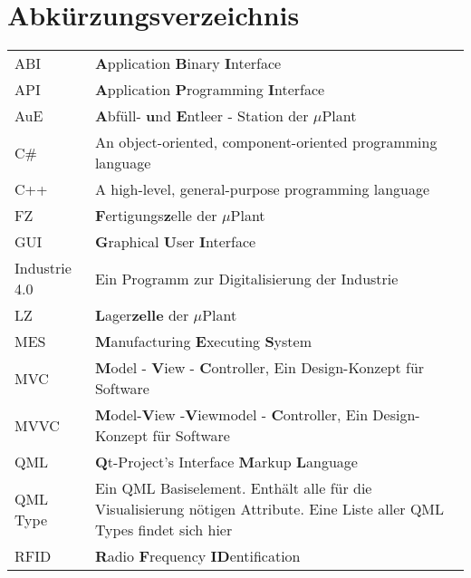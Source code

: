 \chapter*{Abkürzungsverzeichnis}

\begin{center}
	
	\renewcommand{\arraystretch}{1.1}
	\begin{supertabular}{p{2.1cm}p{10.9cm}}
		ABI       & \textbf{A}pplication \textbf{B}inary \textbf{I}nterface \\
		API	      & \textbf{A}pplication \textbf{P}rogramming \textbf{I}nterface \\
		AuE       & \textbf{A}bfüll- \textbf{u}nd \textbf{E}ntleer - Station der $\mu$Plant \\
		C\#       & An object-oriented, component-oriented programming language \\
		C++       & A high-level, general-purpose programming language \\
		FZ        & \textbf{F}ertigungs\textbf{z}elle der $\mu$Plant \\
		GUI       & \textbf{G}raphical \textbf{U}ser \textbf{I}nterface \\
		Industrie 4.0 & Ein Programm zur Digitalisierung der Industrie \\
		LZ        & \textbf{L}ager\textbf{zelle} der $\mu$Plant \\
		MES       & \textbf{M}anufacturing \textbf{E}xecuting \textbf{S}ystem \\
		MVC       & \textbf{M}odel - \textbf{V}iew - \textbf{C}ontroller, Ein Design-Konzept für Software \\
		MVVC      & \textbf{M}odel-\textbf{V}iew -\textbf{V}iewmodel - \textbf{C}ontroller, Ein Design-Konzept für Software \\
		QML       & \textbf{Q}t-Project's Interface \textbf{M}arkup \textbf{L}anguage \\
		QML Type  & Ein QML Basiselement. Enthält alle für die Visualisierung nötigen Attribute. Eine Liste aller QML Types findet sich hier \cite{qmlTypeList} \\
		RFID      & \textbf{R}adio \textbf{F}requency \textbf{ID}entification \\

\end{supertabular}
\end{center}
